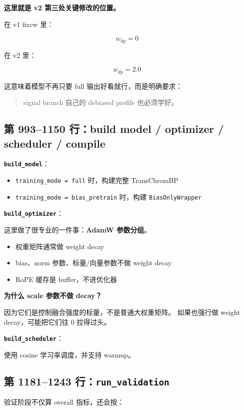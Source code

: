 \documentclass[11pt,a4paper]{ctexart}
\begin{document}
\textbf{这里就是 v2 第三处关键修改的位置。}

在 v1 fixcw 里：

\[
w_{dp}=0
\]

在 v2 里：

\[
w_{dp}=2.0
\]

这意味着模型不再只要 full 输出好看就行，而是明确要求：

\begin{quote}
signal branch 自己的 debiased profile 也必须学好。
\end{quote}

\subsection{第 993--1150 行：build model / optimizer / scheduler / compile}

\textbf{\texttt{build\_model}}：

\begin{itemize}[leftmargin=2em]
\item \texttt{training\_mode = full} 时，构建完整 TransChromBP
\item \texttt{training\_mode = bias\_pretrain} 时，构建 \texttt{BiasOnlyWrapper}
\end{itemize}

\textbf{\texttt{build\_optimizer}}：

这里做了很专业的一件事：\textbf{AdamW 参数分组}。

\begin{itemize}[leftmargin=2em]
\item 权重矩阵通常做 weight decay
\item bias、norm 参数、标量/向量参数不做 weight decay
\item RoPE 缓存是 buffer，不进优化器
\end{itemize}

\textbf{为什么 scale 参数不做 decay？}

因为它们是控制融合强度的标量，不是普通大权重矩阵。
如果也强行做 weight decay，可能把它们往 0 拉得过头。

\textbf{\texttt{build\_scheduler}}：

使用 cosine 学习率调度，并支持 warmup。

\subsection{第 1181--1243 行：\texttt{run\_validation}}

验证阶段不仅算 overall 指标，还会按：
\end{document}
